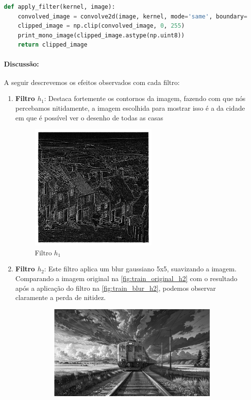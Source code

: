 \documentclass[12pt,a4paper]{report}
\begin{document}
\begin{lstlisting}[language=Python, caption={Algoritmo utilizado para quantização das imagens}]
def apply_filter(kernel, image):
    convolved_image = convolve2d(image, kernel, mode='same', boundary='fill', fillvalue=0)
    clipped_image = np.clip(convolved_image, 0, 255)
    print_mono_image(clipped_image.astype(np.uint8))
    return clipped_image
\end{lstlisting}

\paragraph{Discussão:} 
A seguir descrevemos os efeitos observados com cada filtro:

\begin{enumerate}
    \item \textbf{Filtro $h_1$}: Destaca fortemente os contornos da imagem, fazendo com que nós percebamos nitidamente, a imagem escolhida para mostrar isso é a da cidade em que é possível ver o desenho de todas as casas
    \begin{figure}[H]
      \centering
      \includegraphics[width=0.6\textwidth]{imagens/ex10-01.png}
      \caption{Filtro $h_1$}
    \end{figure}
    \item \textbf{Filtro $h_2$}: Este filtro aplica um blur gaussiano 5x5, suavizando a imagem. Comparando a imagem original na \autoref{fig:train_original_h2} com o resultado após a aplicação do filtro na \autoref{fig:train_blur_h2}, podemos observar claramente a perda de nitidez.
    \begin{figure}[H]
      \centering
      \begin{subfigure}{0.8\textwidth}
        \includegraphics[width=\linewidth]{imagens/train_original.png}

\end{subfigure}
\end{figure}
\end{enumerate}
\end{document}
